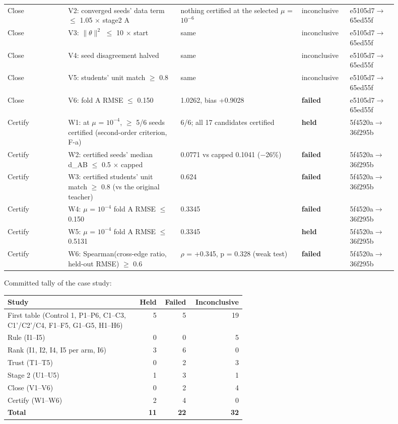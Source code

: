 {\begin{longtable}{R{0.14\linewidth} R{0.26\linewidth} R{0.29\linewidth} R{0.10\linewidth} R{0.11\linewidth}}
Close & V2: converged seeds' data term $\leq$ 1.05 $\times$ stage2 A & nothing certified at the selected $\mu$ = $10^{-6}$ & inconclusive & e5105d7$\to$\allowbreak{}65ed55f \\
Close & V3: $\|\theta\|^{2}$ $\leq$ 10 $\times$ start & same & inconclusive & e5105d7$\to$\allowbreak{}65ed55f \\
Close & V4: seed disagreement halved & same & inconclusive & e5105d7$\to$\allowbreak{}65ed55f \\
Close & V5: students' unit match $\geq$ 0.8 & same & inconclusive & e5105d7$\to$\allowbreak{}65ed55f \\
Close & V6: fold A RMSE $\leq$ 0.150 & 1.0262, bias +0.9028 & \textbf{failed} & e5105d7$\to$\allowbreak{}65ed55f \\
Certify & W1: at $\mu$ = $10^{-4}$, $\geq$ 5/6 seeds certified (second-order criterion, F-a) & 6/6; all 17 candidates certified & \textbf{held} & 5f4520a$\to$\allowbreak{}36f295b \\
Certify & W2: certified seeds' median d\_AB $\leq$ 0.5 $\times$ capped & 0.0771 vs capped 0.1041 ($-$26\%) & \textbf{failed} & 5f4520a$\to$\allowbreak{}36f295b \\
Certify & W3: certified students' unit match $\geq$ 0.8 (vs the original teacher) & 0.624 & \textbf{failed} & 5f4520a$\to$\allowbreak{}36f295b \\
Certify & W4: $\mu$ = $10^{-4}$ fold A RMSE $\leq$ 0.150 & 0.3345 & \textbf{failed} & 5f4520a$\to$\allowbreak{}36f295b \\
Certify & W5: $\mu$ = $10^{-4}$ fold A RMSE $\leq$ 0.5131 & 0.3345 & \textbf{held} & 5f4520a$\to$\allowbreak{}36f295b \\
Certify & W6: Spearman(cross-edge ratio, held-out RMSE) $\geq$ 0.6 & $\rho$ = +0.345, p = 0.328 (weak test) & \textbf{failed} & 5f4520a$\to$\allowbreak{}36f295b \\
\bottomrule
\end{longtable}}
\noindent Committed tally of the case study:

{\footnotesize\setlength{\tabcolsep}{3pt}
\begin{longtable}{R{0.55\linewidth} r r r}
\toprule
Study & Held & Failed & Inconclusive \\
\midrule
\endhead
First table (Control 1, P1--P6, C1--C3, C1'/C2'/C4, F1--F5, G1--G5, H1--H6) & 5 & 5 & 19 \\
Rule (I1--I5) & 0 & 0 & 5 \\
Rank (I1, I2, I4, I5 per arm, I6) & 3 & 6 & 0 \\
Trust (T1--T5) & 0 & 2 & 3 \\
Stage 2 (U1--U5) & 1 & 3 & 1 \\
Close (V1--V6) & 0 & 2 & 4 \\
Certify (W1--W6) & 2 & 4 & 0 \\
\textbf{Total} & \textbf{11} & \textbf{22} & \textbf{32} \\
\bottomrule
\end{longtable}}
